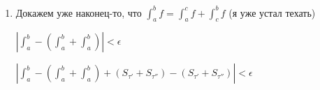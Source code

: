 \documentclass[a4paper]{article}
\begin{document}
\begin{enumerate}
\begin{enumerate}
Ужмём $|f(x)| \leq B, x \in [a,b]$.

Мы хотии получить такую оценку: $\overline{S_\tau} \leq \overline{S_{\tau'}} + \overline{S_{\tau''}} + \text{еще что-то}$.


$\displaystyle \overline{S_\tau} - ( \overline{S_{\tau'}} + \overline{S_{\tau''}}) \leq \text{еще что-то}$

$\displaystyle \overline{S_\tau} - ( \overline{S_{\tau'}} + \overline{S_{\tau''}}) = \{  \sum_{k \neq j} \text{сокращается} \} = M_j \Delta x_j - (sup_{[x_{j-1}, c]} f(x) (c-x_{j-1}) + sup_{[c, x_j]} f(x) (x_j - c)) \leq B \Delta x_j + B(c-x_{j-1} + x_j - c) = 2B \Delta x_j \quad \quad (c-x_{j-1} + x_j - c = \Delta x_j)$

$[x_{j-1}, c] \geq -B$

$[c, x_j] \leq -B$


$\displaystyle \overline{S_\tau} - ( \overline{S_{\tau'}} + \overline{S_{\tau''}}) \leq 2B \lambda_{\tau}$

А для инфимумов получается $\displaystyle \underline{S_\tau} \geq ( \underline{S_{\tau'}} + \underline{S_{\tau''}}) - 2B \lambda_{\tau}$

$\displaystyle \overline{S_\tau} \leq \overline{S_{\tau'}} + \overline{S_{\tau''}} + 2B \lambda_{\tau}$

$\displaystyle \underline{S_\tau} \geq \underline{S_{\tau'}} + \underline{S_{\tau''}} - 2B \lambda_{\tau}$

$\displaystyle \overline{S_\tau} -\underline{S_\tau} \leq \overline{S_{\tau'}} + \overline{S_{\tau''}} + 2 B \lambda_\tau - \underline{S_{\tau'}} - \underline{S_{\tau''}} + 2B \lambda_{\tau} = (\overline{S_{\tau'}} - \underline{S_{\tau'}}) + (\overline{S_{\tau''}} - \underline{S_{\tau''}}) + 4B \lambda_\tau < \epsilon$


$\displaystyle \overline{S_{\tau'}} - \underline{S_{\tau'}} < \frac{\epsilon}{3}$

$\displaystyle \overline{S_{\tau''}} - \underline{S_{\tau''}} < \frac{\epsilon}{3}$

Потому что берем минимальную дельту.

\item Докажем уже наконец-то, что $\displaystyle \int_a^b f = \int_a^c f + \int_c^b f $ (я уже устал техать)

$\displaystyle \left| \int_a^b - \left( \int_a^b + \int_a^b \right) \right| < \epsilon$

$\displaystyle \left| \int_a^b - \left( \int_a^b + \int_a^b \right) + \left( S_{\tau'} + S_{\tau''} \right) - (S_{\tau'} + S_{\tau''}) \right| < \epsilon$


\end{enumerate}
\end{enumerate}
\end{document}
